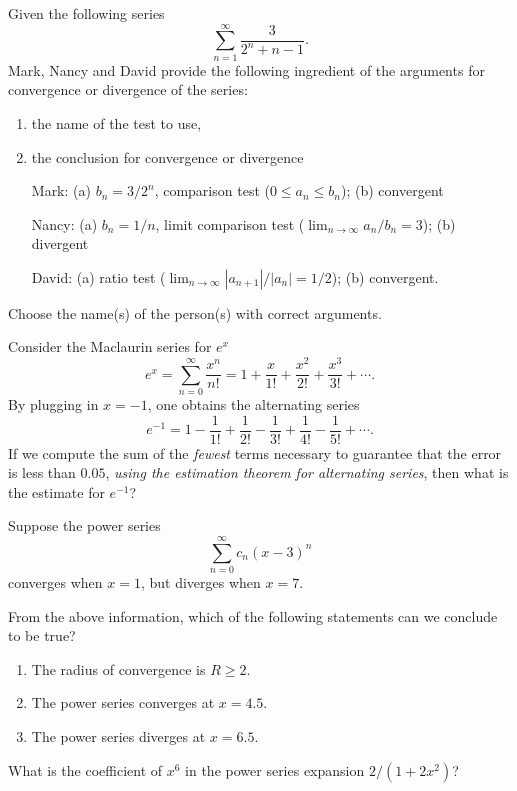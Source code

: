\begin{problem}
Given the following series
\[
\sum_{n=1}^\infty\frac{3}{2^n+n-1}.
\]
Mark, Nancy and David provide the following ingredient of the arguments for
convergence or divergence of the series:
\begin{enumerate}[label=(\alph*)]
\item the name of the test to use,
\item the conclusion for convergence or divergence
\end{enumerate}
\begin{itemize}
\item[Mark:] (a) $b_n=3/2^n$, comparison test ($0\leq a_n\leq b_n$); (b)
  convergent
\item[Nancy:] (a) $b_n=1/n$, limit comparison test ($\lim_{n\to\infty}
  a_n/b_n=3$); (b) divergent
\item[David:] (a) ratio test ($\lim_{n\to\infty}|a_{n+1}|/|a_n|=1/2$); (b)
  convergent.
\end{itemize}
Choose the name(s) of the person(s) with correct arguments.
\end{problem}
\begin{problem}
Consider the Maclaurin series for $e^x$
\[
e^x=\sum_{n=0}^\infty\frac{x^n}{n!}=1+\frac{x}{1!}+\frac{x^2}{2!}+\frac{x^3}{3!}+\dotsb.
\]
By plugging in $x=-1$, one obtains the alternating series
\[
e^{-1}=1-\frac{1}{1!}+\frac{1}{2!}-\frac{1}{3!}+\frac{1}{4!}-\frac{1}{5!}+\dotsb.
\]
If we compute the sum of the \emph{fewest} terms necessary to guarantee
that the error is less than $0.05$, \emph{using the estimation theorem for
  alternating series}, then what is the estimate for $e^{-1}$?
\end{problem}
\begin{problem}
Suppose the power series
\[
\sum_{n=0}^\infty c_n(x-3)^n
\]
converges when $x=1$, but diverges when $x=7$.

From the above information, which of the following statements can we
conclude to be true?
\begin{enumerate}[label=(\MakeUppercase{\roman*})]
\item The radius of convergence is $R\geq 2$.
\item The power series converges at $x=4.5$.
\item The power series diverges at $x=6.5$.
\end{enumerate}
\end{problem}
\begin{problem}
What is the coefficient of $x^6$ in the power series expansion
$2/(1+2x^2)$?
\end{problem}
